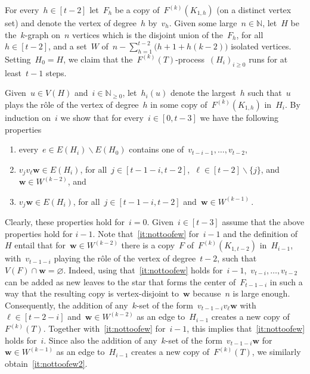 \documentclass[oneside, 12pt]{amsart}
\numberwithin{equation}{section}
\numberwithin{figure}{section}
\let\emptyset=\varnothing
\let\setminus=\smallsetminus
\theoremstyle{plain}
\theoremstyle{note}
\theoremstyle{remark}
\begin{document}
    For every~$h\in[t-2]$ let~$F_h$ be a copy of~$F^{(k)}(K_{1,h})$ (on a distinct vertex set) and denote the vertex of degree~$h$ by~$v_h$.
	Given some large~$n\in\mathds{N}$, let~$H$ be the~$k$-graph on~$n$ vertices which is the disjoint union of the~$F_h$, for all~$h\in[t-2]$, and a set~$W$ of~$n-\sum_{h=1}^{t-2}\big(h+1+h(k-2)\big)$ isolated vertices.
	Setting~$H_0=H$, we claim that the~$F^{(k)}(T)$-process~$(H_i)_{i \ge 0}$ runs for at least~$t-1$ steps.
    
    Given~$u\in V(H)$ and~$i\in\mathds{N}_{\geq0}$, let~$h_i(u)$ denote the largest~$h$ such that~$u$ plays the r\^ole of the vertex of degree~$h$ in some copy of~$F^{(k)}(K_{1,h})$ in~$H_i$.
    By induction on~$i$ we show that for every~$i\in[0,t-3]$ we have the following properties
    \begin{enumerate}
        \item\label{it:nottoomany} every~$e\in E(H_i)\setminus E(H_0)$ contains one of~$v_{t-i-1},\dots,v_{t-2}$,
        \item\label{it:nottoofew} $v_jv_{\ell}\mathbf{w}\in E(H_i)$, for all~$j\in[t-1-i,t-2]$,~$\ell\in[t-2]\setminus\{j\}$, and~$\mathbf{w}\in W^{(k-2)}$, and
        \item\label{it:nottoofew2} $v_j\mathbf{w}\in E(H_i)$, for all~$j\in[t-1-i,t-2]$ and~$\mathbf{w}\in W^{(k-1)}$\,.
    \end{enumerate}
    Clearly, these properties hold for~$i=0$.
    Given~$i\in[t-3]$ assume that the above properties hold for $i-1$.
    Note that~\eqref{it:nottoofew} for~$i-1$ and the definition of~$H$ entail that for~$\mathbf{w}\in W^{(k-2)}$ there is a copy~$F$ of~$F^{(k)}(K_{1,t-2})$ in~$H_{i-1}$, with~$v_{t-1-i}$ playing the r\^ole of the vertex of degree~$t-2$, such that~$V(F)\cap\mathbf{w}=\emptyset$.
    Indeed, using that~\eqref{it:nottoofew} holds for~$i-1$,~$v_{t-i},\dots,v_{t-2}$ can be added as new leaves to the star that forms the center of~$F_{t-1-i}$ in such a way that the resulting copy is vertex-disjoint to~$\mathbf{w}$ because~$n$ is large enough.
    Consequently, the addition of any~$k$-set of the form~$v_{t-1-i}v_{\ell}\mathbf{w}$ with~$\ell\in[t-2-i]$ and~$\mathbf{w}\in W^{(k-2)}$ as an edge to~$H_{i-1}$ creates a new copy of~$F^{(k)}(T)$.
    Together with~\eqref{it:nottoofew} for~$i-1$, this implies that~\eqref{it:nottoofew} holds for~$i$.
    Since also the addition of any~$k$-set of the form~$v_{t-1-i}\mathbf{w}$ for~$\mathbf{w}\in W^{(k-1)}$ as an edge to~$H_{i-1}$ creates a new copy of~$F^{(k)}(T)$, we similarly obtain~\eqref{it:nottoofew2}.
\end{document}
